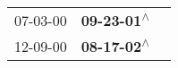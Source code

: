 \begin{supertabular}{lll}
 07-03-00\textsuperscript{} &  \textbf{09-23-01\textsuperscript{$\wedge$}} \\
 12-09-00\textsuperscript{} &  \textbf{08-17-02\textsuperscript{$\wedge$}} \\
\end{supertabular}
